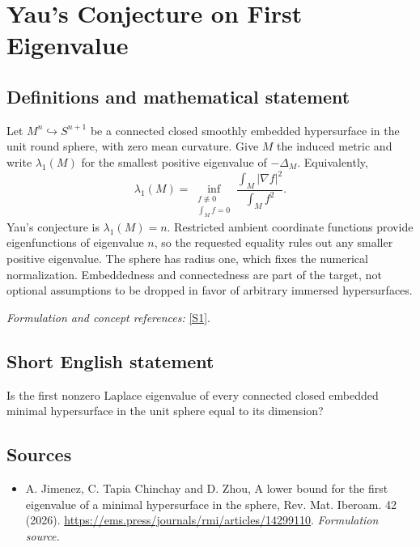 \documentclass[11pt]{article}
\begin{document}
\section*{\texorpdfstring{Yau's Conjecture on First Eigenvalue}{Yau's Conjecture on First Eigenvalue}}\label{statement}
\subsection{Definitions and mathematical statement}
Let $M^n\hookrightarrow S^{n+1}$ be a connected closed smoothly embedded hypersurface in the unit round sphere, with zero mean curvature. Give $M$ the induced metric and write $\lambda_1(M)$ for the smallest positive eigenvalue of $-\Delta_M$. Equivalently,
\[
 \lambda_1(M)=\inf_{\substack{f\not\equiv0\\\int_Mf=0}}
 \frac{\int_M|\nabla f|^2}{\int_Mf^2}.
\]
Yau's conjecture is $\lambda_1(M)=n$. Restricted ambient coordinate functions provide eigenfunctions of eigenvalue $n$, so the requested equality rules out any smaller positive eigenvalue. The sphere has radius one, which fixes the numerical normalization. Embeddedness and connectedness are part of the target, not optional assumptions to be dropped in favor of arbitrary immersed hypersurfaces.
\par\smallskip\textit{Formulation and concept references:} \href{https://ems.press/journals/rmi/articles/14299110}{[S1]}.

\subsection{Short English statement}
Is the first nonzero Laplace eigenvalue of every connected closed embedded minimal hypersurface in the unit sphere equal to its dimension?
\subsection{Sources}
\begin{itemize}
\item[S1]A. Jimenez, C. Tapia Chinchay and D. Zhou, A lower bound for the first eigenvalue of a minimal hypersurface in the sphere, Rev. Mat. Iberoam. 42 (2026).
\url{https://ems.press/journals/rmi/articles/14299110}.
\textit{Formulation source.}
\end{itemize}
\end{document}
